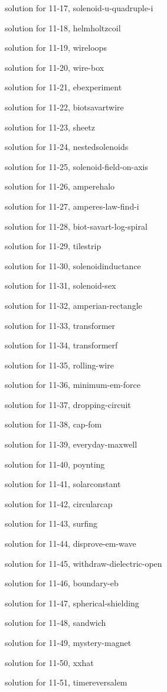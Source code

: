 \documentclass{problems}
\begin{document}
solution for 11-17, solenoid-u-quadruple-i

solution for 11-18, helmholtzcoil

solution for 11-19, wireloops

solution for 11-20, wire-box

solution for 11-21, ebexperiment

solution for 11-22, biotsavartwire

solution for 11-23, sheetz

solution for 11-24, nestedsolenoids

solution for 11-25, solenoid-field-on-axis

solution for 11-26, amperehalo

solution for 11-27, amperes-law-find-i

solution for 11-28, biot-savart-log-spiral

solution for 11-29, tilestrip

solution for 11-30, solenoidinductance

solution for 11-31, solenoid-sex

solution for 11-32, amperian-rectangle

solution for 11-33, transformer

solution for 11-34, transformerf

solution for 11-35, rolling-wire

solution for 11-36, minimum-em-force

solution for 11-37, dropping-circuit

solution for 11-38, cap-fom

solution for 11-39, everyday-maxwell

solution for 11-40, poynting

solution for 11-41, solarconstant

solution for 11-42, circularcap

solution for 11-43, surfing

solution for 11-44, disprove-em-wave

solution for 11-45, withdraw-dielectric-open

solution for 11-46, boundary-eb

solution for 11-47, spherical-shielding

solution for 11-48, sandwich

solution for 11-49, mystery-magnet

solution for 11-50, xxhat

solution for 11-51, timereversalem
\end{document}
